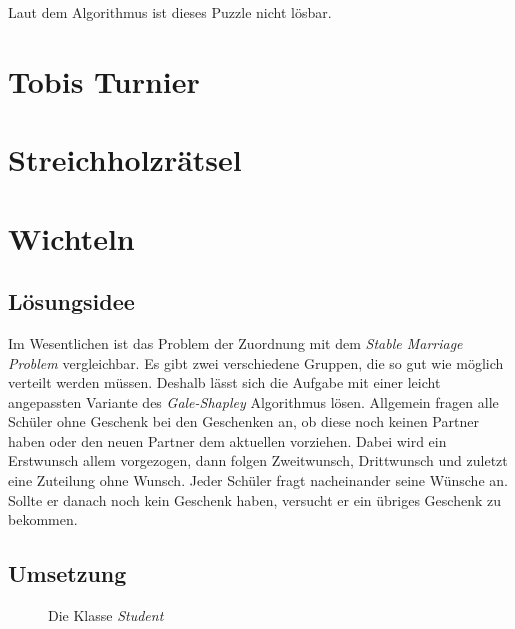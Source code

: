 \documentclass[a4paper, 12pt]{scrartcl}
\begin{document}
Laut dem Algorithmus ist dieses Puzzle nicht lösbar.

\section{Tobis Turnier}

\section{Streichholzrätsel}
\section{Wichteln}
\subsection{Lösungsidee}

Im Wesentlichen ist das Problem der Zuordnung mit dem \emph{Stable Marriage Problem} vergleichbar. Es gibt zwei verschiedene Gruppen, die so gut wie möglich verteilt werden müssen. Deshalb lässt sich die Aufgabe mit einer leicht angepassten Variante des \emph{Gale-Shapley} Algorithmus lösen. Allgemein fragen alle Schüler ohne Geschenk bei den Geschenken an, ob diese noch keinen Partner haben oder den neuen Partner dem aktuellen vorziehen. Dabei wird ein Erstwunsch allem vorgezogen, dann folgen Zweitwunsch, Drittwunsch und zuletzt eine Zuteilung ohne Wunsch. Jeder Schüler fragt nacheinander seine Wünsche an. Sollte er danach noch kein Geschenk haben, versucht er ein übriges Geschenk zu bekommen.

\subsection{Umsetzung}

\begin{figure}[h]
    \centering
    \caption{Die Klasse \emph{Student}}
\end{figure}
\end{document}
